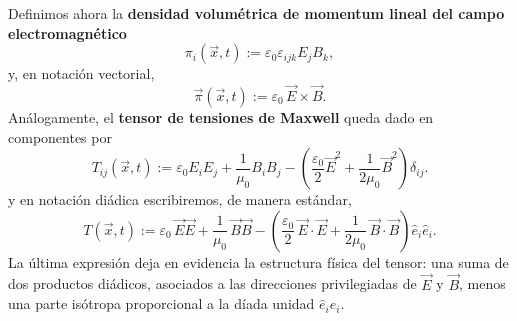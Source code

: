 \documentclass[12pt,a4paper]{article}
\theoremstyle{definition}
\theoremstyle{plain}
\numberwithin{equation}{section}
\theoremstyle{remark}
\newcommand{\E}{\vec{E}}
\newcommand{\B}{\vec{B}}
\begin{document}
Definimos ahora la \textbf{densidad volumétrica de momentum lineal del campo electromagnético}
\begin{equation}
    \pi_i(\vec x,t):=\varepsilon_0\varepsilon_{ijk}E_jB_k,
    \label{eq:momentum-density-indicial}
\end{equation}
y, en notación vectorial,
\begin{equation}
    \vec\pi(\vec x,t):=\varepsilon_0\,\E\times\B.
    \label{eq:momentum-density-diadic}
\end{equation}
Análogamente, el \textbf{tensor de tensiones de Maxwell} queda dado en componentes por
\begin{equation}
    T_{ij}(\vec x,t)
    :=
    \varepsilon_0E_iE_j
    +
    \frac{1}{\mu_0}B_iB_j
    -
    \left(
        \frac{\varepsilon_0}{2}\E^2
        +
        \frac{1}{2\mu_0}\B^2
    \right)\delta_{ij}.
    \label{eq:maxwell-stress-tensor}
\end{equation}
y en notación diádica escribiremos, de manera estándar,
\begin{equation}
    T(\vec x,t)
    :=
    \varepsilon_0\,\E\E
    +
    \frac{1}{\mu_0}\,\B\B
    -
    \left(
        \frac{\varepsilon_0}{2}\,\E\cdot\E
        +
        \frac{1}{2\mu_0}\,\B\cdot\B
    \right)\hat e_i\hat e_i.
    \label{eq:maxwell-stress-tensor-diadic}
\end{equation}
La última expresión deja en evidencia la estructura física del tensor: una suma de dos productos diádicos, asociados a las direcciones privilegiadas de $\E$ y $\B$, menos una parte isótropa proporcional a la díada unidad $\hat e_i\hat e_i$.
\end{document}
